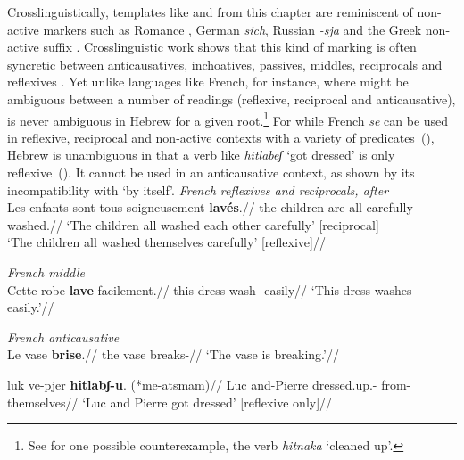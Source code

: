 Crosslinguistically, templates like {\tnif} and {\thit} from this chapter are reminiscent of non-active markers such as Romance , German \emph{sich}, Russian \emph{-sja} and the Greek non-active suffix . Crosslinguistic work shows that this kind of marking is often syncretic between anticausatives, inchoatives, passives, middles, reciprocals and reflexives \citep{geniusiene87,klaiman91,alexiadoudoron12,kastnerzu17}. Yet unlike languages like French, for instance, where  might be ambiguous between a number of readings (reflexive, reciprocal and anticausative), {\thit} is never ambiguous in Hebrew for a given root.\footnote{See \cite{kastner17gjgl} for one possible counterexample, the verb \emph{hitnaka} `cleaned up'.} For while French \emph{se} can be used in reflexive, reciprocal and non-active contexts with a variety of predicates~(\nextx), Hebrew {\thit} is unambiguous in that a verb like \emph{hitlabeʃ} `got dressed' is only reflexive~(\anextx). It cannot be used in an anticausative context, as shown by its incompatibility with `by itself'.
\pex
	\textit{French reflexives and reciprocals, after} \citet[839]{labelle08}\\
	\begingl
	\gla Les enfants  sont tous soigneusement \textbf{lav\'es}.//
	\glb the children  are all carefully washed.//
	\glft `The children all washed each other carefully' \hfill [reciprocal]\\
	`The children all washed themselves carefully' \hfill [reflexive]//
	\endgl

	\a \textit{French middle} \citep[835]{labelle08}\\
	\begingl
	\gla Cette robe  \textbf{lave} facilement.//
	\glb this dress  wash- easily//
	\glft `This dress washes easily.'//
	\endgl
	
	\a \textit{French anticausative} \citep[835]{labelle08}\\
	\begingl
	\gla Le vase  \textbf{brise}.//
	\glb the vase  breaks-//
	\glft `The vase is breaking.'//
	\endgl
\xe

\ex
	\begingl
	\gla luk ve-pjer \textbf{hitlabʃ-u}. (*me-a{ts}mam)//
	\glb Luc and-Pierre dressed.up.- \phantom{(*}from-themselves//
	\glft `Luc and Pierre got dressed' \hfill [reflexive only]//
	\endgl
\xe

